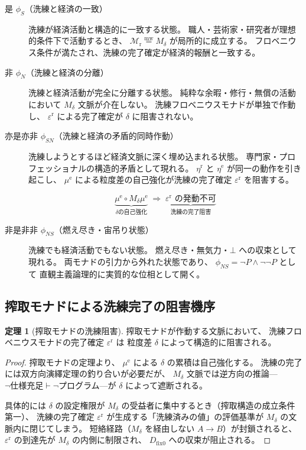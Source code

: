 \documentclass[11pt,a4paper]{article}
\theoremstyle{definition}
\newtheorem{theorem}{定理}[section]
\newcommand{\mweq}{\mathrel{\overset{\mathrm{mw}}{=}}}
\newcommand{\dfix}{D_{\mathrm{fix}0}}
\newcommand{\Mr}{\mathcal{M}_{\mathrm{r}}}
\newcommand{\Md}{M_{\delta}}
\newcommand{\etar}{\eta^{\mathrm{r}}}
\newcommand{\epsr}{\varepsilon^{\mathrm{r}}}
\newcommand{\etae}{\eta^{\mathrm{e}}}
\newcommand{\mue}{\mu^{\mathrm{e}}}
\begin{document}
\begin{description}
\item[是 $\phi_S$（洗練と経済の一致）]
洗練が経済活動と構造的に一致する状態。
職人・芸術家・研究者が理想的条件下で活動するとき、
$\Mr \mweq \Md$ が局所的に成立する。
フロベニウス条件が満たされ、洗練の完了確定が経済的報酬と一致する。

\item[非 $\phi_N$（洗練と経済の分離）]
洗練と経済活動が完全に分離する状態。
純粋な余暇・修行・無償の活動において $\Md$ 文脈が介在しない。
洗練フロベニウスモナドが単独で作動し、
$\epsr$ による完了確定が $\delta$ に阻害されない。

\item[亦是亦非 $\phi_{SN}$（洗練と経済の矛盾的同時作動）]
洗練しようとするほど経済文脈に深く埋め込まれる状態。
専門家・プロフェッショナルの構造的矛盾として現れる。
$\etar$ と $\etae$ が同一の動作を引き起こし、
$\mue$ による粒度差の自己強化が洗練の完了確定 $\epsr$ を阻害する。

\begin{equation}
\underbrace{\mue \circ \Md\mue}_{\delta\text{の自己強化}} \;\Rightarrow\;
\underbrace{\epsr \text{ の発動不可}}_{\text{洗練の完了阻害}}
\end{equation}

\item[非是非非 $\phi_{NS}$（燃え尽き・宙吊り状態）]
洗練でも経済活動でもない状態。
燃え尽き・無気力・$\bot$ への収束として現れる。
両モナドの引力から外れた状態であり、
$\phi_{NS} = \neg P \wedge \neg\neg P$ として
直観主義論理的に実質的な位相として開く。
\end{description}

\subsection{搾取モナドによる洗練完了の阻害機序}

\begin{theorem}[搾取モナドの洗練阻害]
搾取モナドが作動する文脈において、
洗練フロベニウスモナドの完了確定 $\epsr$ は
粒度差 $\delta$ によって構造的に阻害される。
\end{theorem}

\begin{proof}
搾取モナドの定理\cite{Chiba2026_monad}より、
$\mue$ による $\delta$ の累積は自己強化する。
洗練の完了には双方向演繹定理の釣り合いが必要だが、
$\Md$ 文脈では逆方向の推論---
$\neg\text{仕様充足} \vdash \neg\text{プログラム}$---が
$\delta$ によって遮断される。

具体的には $\delta$ の設定権限が $\Md$ の受益者に集中するとき（搾取構造の成立条件第一）、
洗練の完了確定 $\epsr$ が生成する「洗練済みの値」の評価基準が
$\Md$ の文脈内に閉じてしまう。
短絡経路（$\Md$ を経由しない $A \to B$）が封鎖されると、
$\epsr$ の到達先が $\Md$ の内側に制限され、
$\dfix$ への収束が阻止される。
\end{proof}
\end{document}

